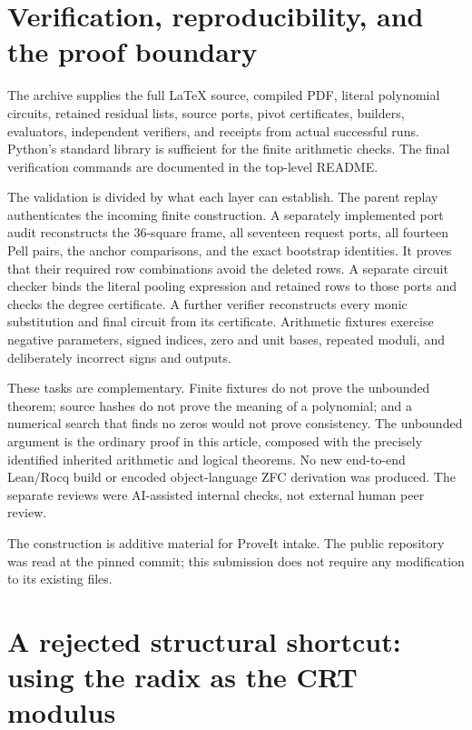 \documentclass[11pt]{article}
\theoremstyle{definition}\newtheorem{definition}[theorem]{Definition}
\begin{document}
\section{Verification, reproducibility, and the proof boundary}
\label{sec:verification}

The archive supplies the full LaTeX source, compiled PDF, literal
polynomial circuits, retained residual lists, source ports, pivot
certificates, builders, evaluators, independent verifiers, and receipts
from actual successful runs. Python's standard library is sufficient
for the finite arithmetic checks. The final verification commands are
documented in the top-level README.

The validation is divided by what each layer can establish. The parent
replay authenticates the incoming finite construction. A separately
implemented port audit reconstructs the 36-square frame, all seventeen
request ports, all fourteen Pell pairs, the anchor comparisons, and
the exact bootstrap identities. It proves that their required row
combinations avoid the deleted rows. A separate circuit checker binds
the literal pooling expression and retained rows to those ports and
checks the degree certificate. A further verifier reconstructs every
monic substitution and final circuit from its certificate. Arithmetic
fixtures exercise negative parameters, signed indices, zero and unit
bases, repeated moduli, and deliberately incorrect signs and outputs.

These tasks are complementary. Finite fixtures do not prove the
unbounded theorem; source hashes do not prove the meaning of a
polynomial; and a numerical search that finds no zeros would not prove
consistency. The unbounded argument is the ordinary proof in this
article, composed with the precisely identified inherited arithmetic
and logical theorems. No new end-to-end Lean/Rocq build or encoded
object-language ZFC derivation was produced. The separate reviews were
AI-assisted internal checks, not external human peer review.

The construction is additive material for ProveIt intake. The public
repository was read at the pinned commit; this submission does not
require any modification to its existing files.

\section{A rejected structural shortcut: using the radix as the CRT modulus}
\label{sec:obstruction}
\end{document}
